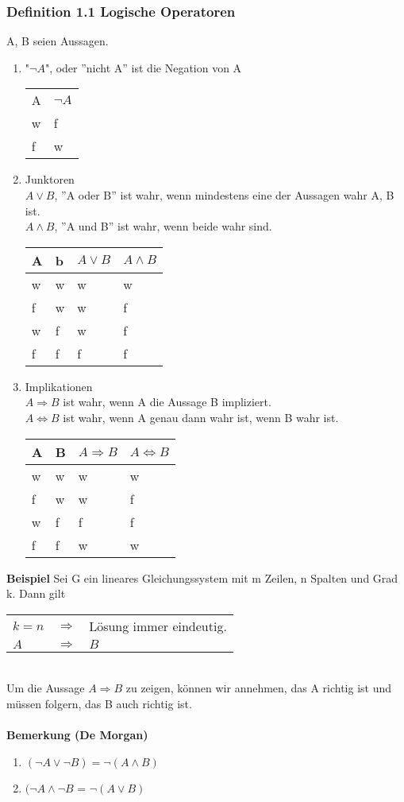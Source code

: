 \documentclass{report}
\theoremstyle{customrem}
\theoremstyle{customdef}
\begin{document}
\subsubsection{Definition 1.1 Logische Operatoren}
A, B seien Aussagen.
\begin{enumerate}
\item{"$\neg A$", oder ''nicht A'' ist die Negation von A\\
\begin{tabular}{l | l}
A & $\neg A$\\
w & f\\
f & w
\end{tabular}
}
\item{Junktoren\\
$A \lor B$, ''A oder B'' ist wahr, wenn mindestens eine der Aussagen wahr A, B ist.\\
$A \land B$, ''A und B'' ist wahr, wenn beide wahr sind.\\
\begin{tabular}{l | l | l | l}
A & b & $A \lor B$ & $A\land B$\\
\hline
w & w & w & w\\
f & w & w & f\\
w & f & w & f\\
f & f & f & f
\end{tabular}
}
\item{Implikationen\\
$A \Rightarrow B$ ist wahr, wenn A die Aussage B impliziert.\\
$A \Leftrightarrow B$  ist wahr, wenn A genau dann wahr ist, wenn B wahr ist.\\
\begin{tabular}{l | l | l | l}
A & B & $A \Rightarrow B$ & $A \Leftrightarrow B$\\
\hline
w & w & w & w\\
f & w & w & f\\
w & f & f & f\\
f & f & w & w
\end{tabular}
}
\end{enumerate}
\textbf{Beispiel} Sei G ein lineares Gleichungssystem mit m Zeilen, n Spalten und Grad k. Dann gilt \\
\begin{tabular}{l c l}
$k = n$ & $\Rightarrow$ & Lösung immer eindeutig.\\
$A$ & $\Rightarrow$ &  $B$\\
\end{tabular}\\
Um die Aussage $A \Rightarrow B$ zu zeigen, können wir annehmen, das A richtig ist und müssen folgern, das B auch richtig ist.\\
\\
\textbf{Bemerkung (De Morgan)}
\begin{enumerate}
\item{$(\neg A \lor \neg B) = \neg (A \land B)$}
\item{$(\neg A \land \neg B$ = $\neg (A \lor B)$}
\end{enumerate}
\end{document}

